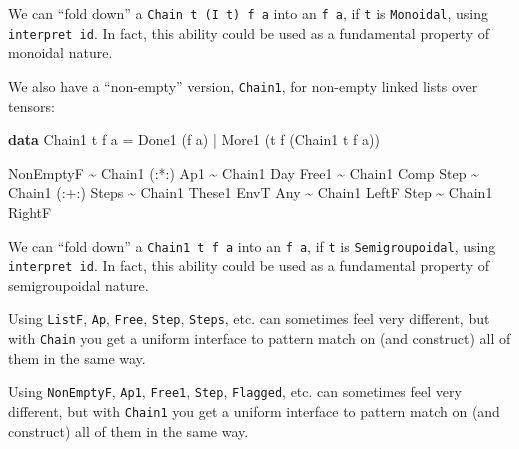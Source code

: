 \documentclass[]{article}
\newenvironment{Shaded}{}{}
\newcommand{\DataTypeTok}[1]{\textcolor[rgb]{0.56,0.13,0.00}{#1}}
\newcommand{\KeywordTok}[1]{\textcolor[rgb]{0.00,0.44,0.13}{\textbf{#1}}}
\newcommand{\NormalTok}[1]{#1}
\newcommand{\OperatorTok}[1]{\textcolor[rgb]{0.40,0.40,0.40}{#1}}
\newcommand{\OtherTok}[1]{\textcolor[rgb]{0.00,0.44,0.13}{#1}}
\begin{document}
\begin{itemize}
  We can ``fold down'' a \texttt{Chain\ t\ (I\ t)\ f\ a} into an \texttt{f\ a},
  if \texttt{t} is \texttt{Monoidal}, using \texttt{interpret\ id}. In fact,
  this ability could be used as a fundamental property of monoidal nature.

  We also have a ``non-empty'' version, \texttt{Chain1}, for non-empty linked
  lists over tensors:

\begin{Shaded}
\begin{Highlighting}[]
\KeywordTok{data} \DataTypeTok{Chain1}\NormalTok{ t f a }\OtherTok{=} \DataTypeTok{Done1}\NormalTok{ (f a)}
                  \OperatorTok{|} \DataTypeTok{More1}\NormalTok{ (t f (}\DataTypeTok{Chain1}\NormalTok{ t f a))}
\end{Highlighting}
\end{Shaded}

\begin{Shaded}
\begin{Highlighting}[]
\DataTypeTok{NonEmptyF} \OperatorTok{\textasciitilde{}} \DataTypeTok{Chain1}\NormalTok{ (}\OperatorTok{:*:}\NormalTok{)}
\DataTypeTok{Ap1}       \OperatorTok{\textasciitilde{}} \DataTypeTok{Chain1} \DataTypeTok{Day}
\DataTypeTok{Free1}     \OperatorTok{\textasciitilde{}} \DataTypeTok{Chain1} \DataTypeTok{Comp}
\DataTypeTok{Step}      \OperatorTok{\textasciitilde{}} \DataTypeTok{Chain1}\NormalTok{ (}\OperatorTok{:+:}\NormalTok{)}
\DataTypeTok{Steps}     \OperatorTok{\textasciitilde{}} \DataTypeTok{Chain1} \DataTypeTok{These1}
\DataTypeTok{EnvT} \DataTypeTok{Any}  \OperatorTok{\textasciitilde{}} \DataTypeTok{Chain1} \DataTypeTok{LeftF}
\DataTypeTok{Step}      \OperatorTok{\textasciitilde{}} \DataTypeTok{Chain1} \DataTypeTok{RightF}
\end{Highlighting}
\end{Shaded}

  We can ``fold down'' a \texttt{Chain1\ t\ f\ a} into an \texttt{f\ a}, if
  \texttt{t} is \texttt{Semigroupoidal}, using \texttt{interpret\ id}. In fact,
  this ability could be used as a fundamental property of semigroupoidal nature.

  Using \texttt{ListF}, \texttt{Ap}, \texttt{Free}, \texttt{Step},
  \texttt{Steps}, etc. can sometimes feel very different, but with
  \texttt{Chain} you get a uniform interface to pattern match on (and construct)
  all of them in the same way.

  Using \texttt{NonEmptyF}, \texttt{Ap1}, \texttt{Free1}, \texttt{Step},
  \texttt{Flagged}, etc. can sometimes feel very different, but with
  \texttt{Chain1} you get a uniform interface to pattern match on (and
  construct) all of them in the same way.


\end{itemize}
\end{document}

